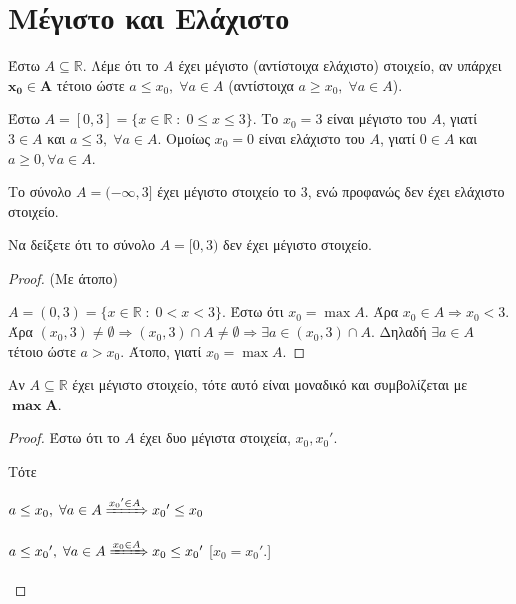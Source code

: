 \documentclass[main.tex]{subfiles}
\begin{document}
\section{Μέγιστο και Ελάχιστο}

\begin{mydfnbox}
Έστω $ A \subseteq \mathbb{R} $. Λέμε ότι το $A$ έχει μέγιστο 
  (αντίστοιχα ελάχιστο) στοιχείο, αν υπάρχει $ \bm{x_{0} \in A} $ τέτοιο 
  ώστε $ a \leq x_{0}, \; \forall a \in A $ (αντίστοιχα $ a \geq x_{0}, \; \forall a \in A$).
\end{mydfnbox}

\begin{example}
  Έστω $ A = [0,3] = \{ x \in \mathbb{R} \; : \; 0 \leq x \leq 3 \} $. 
  Το $ x_{0}= 3 $ είναι μέγιστο του $A$, γιατί $ 3 \in A $ και 
  $ a \leq 3, \; \forall a \in A $. Ομοίως $ x_{0}= 0 $ είναι ελάχιστο 
  του $A$, γιατί $ 0 \in A $ και $ a \geq 0, \forall a \in A $.
\end{example}

\begin{example}
  Το σύνολο $ A=(- \infty, 3] $ έχει μέγιστο στοιχείο το 3, ενώ προφανώς δεν έχει 
  ελάχιστο στοιχείο.
\end{example}

\begin{example}
  Να δείξετε ότι το σύνολο $ A = [0,3) $ δεν έχει μέγιστο στοιχείο.
\end{example}
\begin{proof}(Με άτοπο)
\item {}
  $ A = (0,3) = \{ x \in \mathbb{R} \; : \; 0 < x < 3 \} $. 
  Έστω ότι $ x_{0} = \max A $. Άρα $ x_{0} \in A \Rightarrow  x_{0} 
  < 3$. Άρα  $ (x_{0}, 3) \neq \emptyset \Rightarrow (x_{0},3) \cap A \neq 
  \emptyset \Rightarrow \exists a \in (x_{0},3) \cap A $. Δηλαδή $ 
  \exists a \in A$ τέτοιο ώστε $ a > x_{0} $. Άτοπο, γιατί $ x_{0}= \max A $.
\end{proof}


\begin{mypropbox}
Αν $ A \subseteq \mathbb{R} $ έχει μέγιστο στοιχείο, τότε αυτό είναι 
μοναδικό και συμβολίζεται με $ \bm{\max A} $.
\end{mypropbox}
\begin{proof}
  Έστω ότι το $A$ έχει δυο μέγιστα στοιχεία,  $ x_{0}, {x_{0}}' $.

  Τότε 
  \begin{myitemize}
    \item $ a \leq x_{0}, \; \forall a \in A \xRightarrow{{x_{0}}' 
      \in A } {x_{0}}'  \leq x_{0} $ 
    \item $ a \leq {x_{0}}', \; \forall a \in A \xRightarrow{x_{0} 
      \in A } x_{0} \leq {x_{0}}' $ 
      [$ x_{0} = {x_{0}}' $.] 
  \end{myitemize}
\end{proof}
\end{document}
